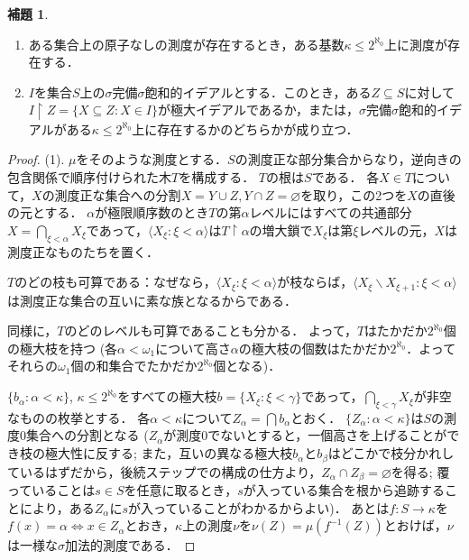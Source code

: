 \documentclass[uplatex]{jsarticle}
\newcommand{\restrict}{\upharpoonright}
\newcommand{\seq}[1]{{\langle#1\rangle}}
\renewcommand\emptyset{\varnothing}
\renewcommand\subset{\subseteq}
\renewcommand{\setminus}{\smallsetminus}
\theoremstyle{definition}
\newtheorem{lem}[thm]{補題}
\begin{document}
	\begin{lem}\label{lem:continuum}
		\begin{enumerate}
			\item ある集合上の原子なしの測度が存在するとき，ある基数$\kappa \le 2^{\aleph_0}$上に測度が存在する．
			\item $I$を集合$S$上の$\sigma$完備$\sigma$飽和的イデアルとする．このとき，ある$Z \subset S$に対して$I \restrict Z = \{ X \subset Z : X \in I \}$が極大イデアルであるか，または，$\sigma$完備$\sigma$飽和的イデアルがある$\kappa \le 2^{\aleph_0}$上に存在するかのどちらかが成り立つ．
		\end{enumerate}
	\end{lem}
	\begin{proof}
		(1). $\mu$をそのような測度とする．$S$の測度正な部分集合からなり，逆向きの包含関係で順序付けられた木$T$を構成する．
		$T$の根は$S$である．
		各$X \in T$について，$X$の測度正な集合への分割$X = Y \cup Z, Y \cap Z = \emptyset$を取り，この2つを$X$の直後の元とする．
		$\alpha$が極限順序数のとき$T$の第$\alpha$レベルにはすべての共通部分$X = \bigcap_{\xi < \alpha} X_\xi$であって，$\seq{X_\xi : \xi < \alpha}$は$T \restrict \alpha$の増大鎖で$X_\xi$は第$\xi$レベルの元，$X$は測度正なものたちを置く．
		
		$T$のどの枝も可算である：なぜなら，$\seq{X_\xi : \xi < \alpha}$が枝ならば，$\seq{ X_\xi \setminus X_{\xi+1} : \xi < \alpha }$は測度正な集合の互いに素な族となるからである．
		
		同様に，$T$のどのレベルも可算であることも分かる．
		よって，$T$はたかだか$2^{\aleph_0}$個の極大枝を持つ (各$\alpha < \omega_1$について高さ$\alpha$の極大枝の個数はたかだか$2^{\aleph_0}$．よってそれらの$\omega_1$個の和集合でたかだか$2^{\aleph_0}$個となる)．
		
		$\{ b_\alpha : \alpha < \kappa \}$, $\kappa \le 2^{\aleph_0}$をすべての極大枝$b = \{ X_\xi : \xi < \gamma \}$であって，$\bigcap_{\xi < \gamma} X_\xi$が非空なものの枚挙とする．
		各$\alpha < \kappa$について$Z_\alpha = \bigcap b_\alpha$とおく．
		$\{ Z_\alpha : \alpha < \kappa \}$は$S$の測度$0$集合への分割となる 
		($Z_\alpha$が測度$0$でないとすると，一個高さを上げることができ枝の極大性に反する; また，互いの異なる極大枝$b_\alpha$と$b_\beta$はどこかで枝分かれしているはずだから，後続ステップでの構成の仕方より，$Z_\alpha \cap Z_\beta = \emptyset$を得る; 覆っていることは$s \in S$を任意に取るとき，$s$が入っている集合を根から追跡することにより，ある$Z_\alpha$に$s$が入っていることがわかるからよい)．
		あとは$f \colon S \to \kappa$を$f(x) = \alpha \iff x \in Z_\alpha$とおき，$\kappa$上の測度$\nu$を$\nu(Z) = \mu(f^{-1}(Z))$とおけば，$\nu$は一様な$\sigma$加法的測度である．
		

\end{proof}
\end{document}
